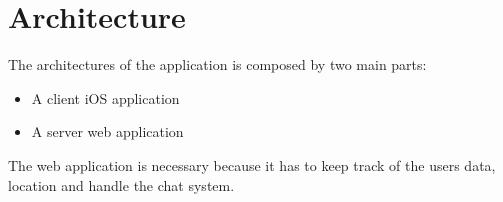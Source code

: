 \section{Architecture}
The architectures of the application is composed by two main parts:
\begin{itemize}
\item A client iOS application
\item A server web application
\end{itemize}
The web application is necessary because it has to keep track of the users data, location and handle the chat system.
